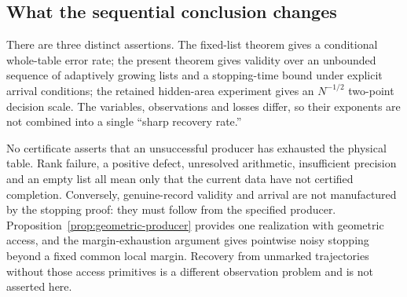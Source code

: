 \subsection{What the sequential conclusion changes}
There are three distinct assertions. The fixed-list theorem gives a
conditional whole-table error rate; the present theorem gives validity
over an unbounded sequence of adaptively growing lists and a stopping-time
bound under explicit arrival conditions; the retained hidden-area experiment
gives an $N^{-1/2}$ two-point decision scale. The variables, observations
and losses differ, so their exponents are not combined into a single
``sharp recovery rate.''

No certificate asserts that an unsuccessful producer has exhausted the
physical table. Rank failure, a positive defect, unresolved arithmetic,
insufficient precision and an empty list all mean only that the current
data have not certified completion. Conversely, genuine-record validity
and arrival are not manufactured by the stopping proof: they must follow
from the specified producer. Proposition~\ref{prop:geometric-producer}
provides one realization with geometric access, and the margin-exhaustion
argument gives pointwise noisy stopping beyond a fixed common local margin.
Recovery from unmarked trajectories without those access primitives is a
different observation problem and is not asserted here.
